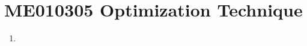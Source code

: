 
\chapter{ME010305 Optimization Technique}
\begin{enumerate}[label=Week \arabic*]
	\item 
\end{enumerate}
